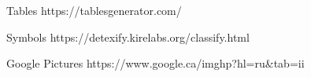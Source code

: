Tables
https://tablesgenerator.com/

Symbols
https://detexify.kirelabs.org/classify.html

Google Pictures
https://www.google.ca/imghp?hl=ru&tab=ii
